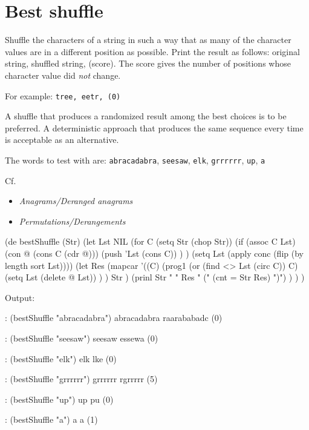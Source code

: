 \pagebreak{}
\section*{Best shuffle}


Shuffle the characters of a string in such a way that as many of the
character values are in a different position as possible. Print the
result as follows: original string, shuffled string, (score). The score
gives the number of positions whose character value did \emph{not}
change.

For example: \texttt{tree, eetr, (0)}

A shuffle that produces a randomized result among the best choices is to
be preferred. A deterministic approach that produces the same sequence
every time is acceptable as an alternative.

The words to test with are: \texttt{abracadabra}, \texttt{seesaw},
\texttt{elk}, \texttt{grrrrrr}, \texttt{up}, \texttt{a}

Cf.

\begin{itemize}
\item
  \emph{Anagrams/Deranged anagrams}
\item
  \emph{Permutations/Derangements}
\end{itemize}


\begin{wideverbatim}

(de bestShuffle (Str)
   (let Lst NIL
      (for C (setq Str (chop Str))
         (if (assoc C Lst)
            (con @ (cons C (cdr @)))
            (push 'Lst (cons C)) ) )
      (setq Lst (apply conc (flip (by length sort Lst))))
      (let Res
         (mapcar
            '((C)
               (prog1 (or (find <> Lst (circ C)) C)
                  (setq Lst (delete @ Lst)) ) )
            Str )
         (prinl Str " " Res " (" (cnt = Str Res) ")") ) ) )

Output:

: (bestShuffle "abracadabra")
abracadabra raarababadc (0)

: (bestShuffle "seesaw")
seesaw essewa (0)

: (bestShuffle "elk")
elk lke (0)

: (bestShuffle "grrrrrr")
grrrrrr rgrrrrr (5)

: (bestShuffle "up")
up pu (0)

: (bestShuffle "a")
a a (1)

\end{wideverbatim}

